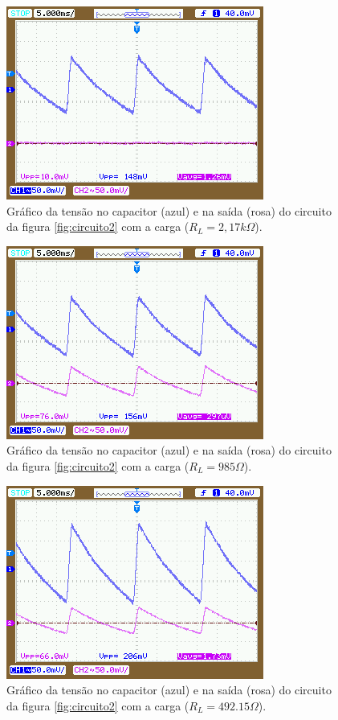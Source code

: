 \documentclass{abntex2}
\begin{document}
\begin{figure}[h]
  \centering
  \includegraphics[scale = 0.7]{exp2-2.png}
  \caption{Gráfico da tensão no capacitor (azul) e na saída (rosa) do circuito da figura \ref{fig:circuito2} com a carga ($R_L = 2,17k\Omega$).}
  \label{fig:graf2}
\end{figure}

\begin{figure}[h]
  \centering
  \includegraphics[scale = 0.7]{exp2-3.png}
  \caption{Gráfico da tensão no capacitor (azul) e na saída (rosa) do circuito da figura \ref{fig:circuito2} com a carga ($R_L = 985\Omega$).}
  \label{fig:graf3}
\end{figure}

\begin{figure}[h]
  \centering
  \includegraphics[scale = 0.7]{exp2-4.png}
  \caption{Gráfico da tensão no capacitor (azul) e na saída (rosa) do circuito da figura \ref{fig:circuito2} com a carga ($R_L = 492.15\Omega$).}
  \label{fig:graf4}
\end{figure}
\end{document}
